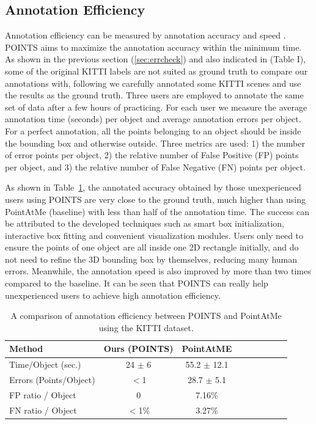 \documentclass[letterpaper, 10 pt, conference]{ieeeconf}  %
\begin{document}
\subsection{Annotation Efficiency}

Annotation efficiency can be measured by annotation accuracy and speed \cite{pointatme} \cite{Zimmer20193DBA}. POINTS aims to maximize the annotation accuracy within the minimum time.
As shown in the previous section (\ref{sec:errcheck}) and also indicated in  \cite{pointatme} (Table I), some of the original KITTI labels are not suited as ground truth to compare our annotations with, following \cite{pointatme} we carefully annotated some KITTI scenes and use the results as the ground truth.
Three users are employed to annotate the same set of data after a few hours of practicing. 
For each user we measure the average annotation time (seconds) per object and average annotation errors per object.
For a perfect annotation, all the points belonging to an object should be inside the bounding box and otherwise outside. 
Three metrics are used: 1) the number of error points per object, 
2) the relative number of False Positive (FP) points per object, and 
3) the relative number of False Negative (FN) points per object. 

As shown in Table~\ref{tab:annotation-evaluation}, the annotated accuracy obtained by those unexperienced users using POINTS are very close to the ground truth,
much higher than using PointAtMe (baseline) with less than half of the annotation time. 
The success can be attributed to the developed techniques such as smart box initialization, interactive box fitting and convenient visualization modules. 
Users only need to ensure the points of one object are all inside one 2D rectangle initially, and do not need to refine the 3D bounding box by themselves, 
reducing many human errors. 
Meanwhile, the annotation speed is also improved by more than two times compared to the baseline. 
It can be seen that POINTS can really help unexperienced users to achieve high annotation efficiency. 



\begin{table}[h]
	\centering
	\caption{A comparison of annotation efficiency between POINTS and PointAtMe using the KITTI dataset.}
	\label{tab:annotation-evaluation}
	\begin{tabular}{|l|c|c|c|c||c|c|c|c|}
		\hline
		\textbf{Method} & \textbf{Ours (POINTS)} & \textbf{PointAtME\cite{pointatme}} \\
		\hline
		\hline
		Time/Object (sec.) & 24 $\pm$ 6 & 55.2 $\pm$ 12.1\\
		\hline
		Errors (Points/Object) & $<$1 & 28.7 $\pm$ 5.1\\
		\hline
		FP ratio / Object & 0 & 7.16\%\\
		\hline
		FN ratio / Object & $<$1\% & 3.27\%\\
		\hline
	\end{tabular}
\end{table}
\end{document}

